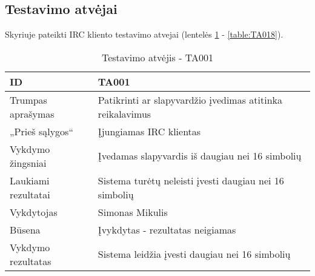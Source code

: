 \subsection{Testavimo atvėjai}

Skyriuje pateikti IRC kliento testavimo atvejai (lentelės \ref{table:TA001} - \ref{table:TA018}).

\begin{table}[H]
  \centering
  \begin{tabular}{|l|l|}
    \hline
    ID                  & TA001                                                                  \\ \hline
    Trumpas aprašymas   & Patikrinti ar slapyvardžio įvedimas atitinka reikalavimus              \\ \hline
    „Prieš sąlygos“     & Įjungiamas IRC klientas                                                \\ \hline
    Vykdymo žingsniai   & Įvedamas slapyvardis iš daugiau nei 16 simbolių                        \\ \hline
    Laukiami rezultatai & Sistema turėtų neleisti įvesti daugiau nei 16 simbolių                 \\ \hline
    Vykdytojas          & Simonas Mikulis                                                        \\ \hline
    Būsena              & Įvykdytas - rezultatas neigiamas                                       \\ \hline
    Vykdymo rezultatas  & \cellcolor[HTML]{FF0000}Sistema leidžia įvesti daugiau nei 16 simbolių \\ \hline
  \end{tabular}
  \caption{Testavimo atvėjis - TA001}
  \label{table:TA001}
\end{table}

